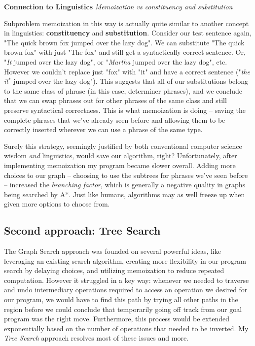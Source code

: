 \documentclass[runningheads]{llncs}
\begin{document}
\begin{tcolorbox}[colframe=black,colback=white,boxrule=0.5pt,arc=2pt]
\textbf{Connection to Linguistics} \textit{Memoization vs constituency and substitution}

Subproblem memoization in this way is actually quite similar to another concept in linguistics: \textbf{constituency} and \textbf{substitution}. Consider our test sentence again, "The quick brown fox jumped over the lazy dog". We can substitute "The quick brown fox" with just "The fox" and still get a syntactically correct sentence. Or, "\textit{It} jumped over the lazy dog", or "\textit{Martha} jumped over the lazy dog", etc. However we couldn't replace just "fox" with "it" and have a correct sentence ("\textit{the it}$^*$ jumped over the lazy dog"). This suggests that all of our substitutions belong to the same class of phrase (in this case, determiner phrases), and we conclude that we can swap phrases out for other phrases of the same class and still preserve syntactical correctness. This is what memoization is doing -- saving the complete phrases that we've already seen before and allowing them to be correctly inserted wherever we can use a  phrase of the same type.
\end{tcolorbox}
Surely this strategy, seemingly justified by both conventional computer science wisdom \textit{and} linguistics, would save our algorithm, right? Unfortunately, after implementing memoization my program became slower overall. Adding more choices to our graph -- choosing to use the subtrees for phrases we've seen before -- increased the \textit{branching factor}, which is generally a negative quality in graphs being searched by A*. Just like humans, algorithms may as well freeze up when given more options to choose from.

\subsection{Second approach: Tree Search}
The Graph Search approach was founded on several powerful ideas, like leveraging an existing search algorithm, creating more flexibility in our program search by delaying choices, and utilizing memoization to reduce repeated computation. However it struggled in a key way: whenever we needed to traverse and undo intermediary operations required to access an operation we desired for our program, we would have to find this path by trying all other paths in the region before we could conclude that temporarily going off track from our goal program was the right move. Furthermore, this process would be extended exponentially based on the number of operations that needed to be inverted. My \textit{Tree Search} approach resolves most of these issues and more.
\end{document}
